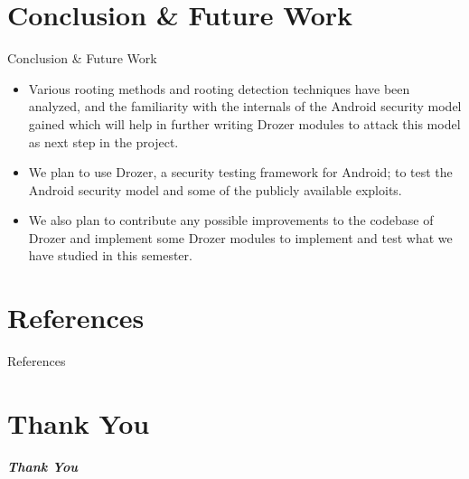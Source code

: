 \documentclass{beamer}
\begin{document}
\section{Conclusion \& Future Work}
\begin{frame}[allowframebreaks]{Conclusion \& Future Work}
    \begin{itemize}
        \item Various rooting methods and rooting detection techniques have been analyzed, and the familiarity with the internals of the Android security model gained which will help in further writing Drozer modules to attack this model as next step in the project.
        \item We plan to use Drozer, a security testing framework for Android; to test the Android security model and some of the publicly available exploits. 
        \item We also plan to contribute any possible improvements to the codebase of Drozer and implement some Drozer modules to implement and test what we have studied in this semester.
    \end{itemize}
\end{frame}

\section{References}
\begin{frame}[label=references,noframenumbering,plain]{References}
    
    
    \nocite{*}
\end{frame}

\section*{Thank You}
\begin{frame}
    \centering \Huge
    \emph{\textbf{Thank You}}
\end{frame}
\end{document}
